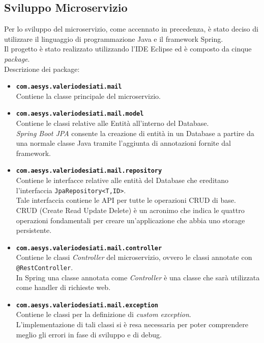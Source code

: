 \subsection{Sviluppo Microservizio}\label{sec:sviluppomicroservizio}
Per lo sviluppo del microservizio, come accennato in precedenza, è stato deciso di utilizzare il linguaggio di programmazione Java e il framework Spring.\\
Il progetto è stato realizzato utilizzando l'IDE Eclipse ed è composto da cinque \emph{package}.\\
Descrizione dei package:
\begin{itemize}
	\item \textbf{\texttt{com.aesys.valeriodesiati.mail}}\\ Contiene la classe principale del microservizio.
	\item \textbf{\texttt{com.aesys.valeriodesiati.mail.model}}\\ Contiene le classi relative alle Entità all'interno del Database.\\
	\emph{Spring Boot JPA} consente la creazione di entità in un Database a partire da una normale classe Java tramite l'aggiunta di annotazioni fornite dal framework.
	\item \textbf{\texttt{com.aesys.valeriodesiati.mail.repository}}\\ Contiene le interfacce relative alle entità del Database che ereditano l'interfaccia 
	\texttt{JpaRepository<T,ID>}.\\ Tale interfaccia contiene le API per tutte le operazioni CRUD di base.\\ CRUD (Create Read Update Delete) è un acronimo 
	che indica le quattro operazioni fondamentali per creare un'applicazione che abbia uno storage persistente.
	\item \textbf{\texttt{com.aesys.valeriodesiati.mail.controller}}\\ Contiene le classi \emph{Controller} del microservizio, ovvero le classi annotate con 
	\texttt{@RestController}.\\ In Spring una classe annotata come \emph{Controller} è una classe che sarà utilizzata come handler di richieste web.
	\item \textbf{\texttt{com.aesys.valeriodesiati.mail.exception}}\\ Contiene le classi per la definizione di \emph{custom exception}.\\ L'implementazione 
	di tali classi si è resa necessaria per poter comprendere meglio gli errori in fase di sviluppo e di debug.\\
\end{itemize}


